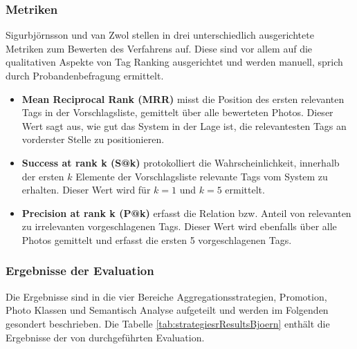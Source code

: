 \subsubsection{Metriken} %
\label{ssub:metriken}
Sigurbjörnsson und van Zwol stellen in \cite{collectiveKnowledge} drei unterschiedlich ausgerichtete Metriken zum Bewerten des Verfahrens auf. Diese sind vor allem auf die qualitativen Aspekte von Tag Ranking ausgerichtet und werden manuell, sprich durch Probandenbefragung ermittelt.
\begin{itemize}
  \item \textbf{Mean Reciprocal Rank (MRR)} misst die Position des ersten relevanten Tags in der Vorschlagsliste, gemittelt über alle bewerteten Photos. Dieser Wert sagt aus, wie gut das System in der Lage ist, die relevantesten Tags an vorderster Stelle zu positionieren.
  \item \textbf{Success at rank k (S@k)} protokolliert die Wahrscheinlichkeit, innerhalb der ersten $k$ Elemente der Vorschlagsliste relevante Tags vom System zu erhalten. Dieser Wert wird für $k = 1$ und $k = 5$ ermittelt.
  \item \textbf{Precision at rank k (P@k)} erfasst die Relation bzw. Anteil von relevanten zu irrelevanten vorgeschlagenen Tags. Dieser Wert wird ebenfalls über alle Photos gemittelt und erfasst die ersten 5 vorgeschlagenen Tags.
\end{itemize}


\subsubsection{Ergebnisse der Evaluation} %
\label{ssub:ergebnisse_der_evaluation}

Die Ergebnisse sind in die vier Bereiche Aggregationsstrategien, Promotion, Photo Klassen und Semantisch Analyse aufgeteilt und werden im Folgenden gesondert beschrieben. Die Tabelle \ref{tab:strategiesrResultsBjoern} enthält die Ergebnisse der von \cite{collectiveKnowledge} durchgeführten Evaluation. 

